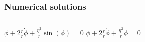 \documentclass[swedish, english]{beamer}
\newcommand{\ee}{\mathrm{e}}
\begin{document}










\begin{frame}
\frametitle{Numerical solutions}


\centerline{
\resizebox{1.1\textwidth}{!}{
}
}


\begin{columns}
\hspace{25pt}
$\displaystyle
\ddot\phi + 2\frac{\dot{r}}{r}\dot\phi + \frac{\eta^2}{r}\sin(\phi)=0
$
\hspace{22pt}
$ \displaystyle
\ddot\phi + 2\frac{\dot{r}}{r}\dot\phi + \frac{\eta^2}{r}\phi=0 
$
\end{columns}

\end{frame}
\end{document}
